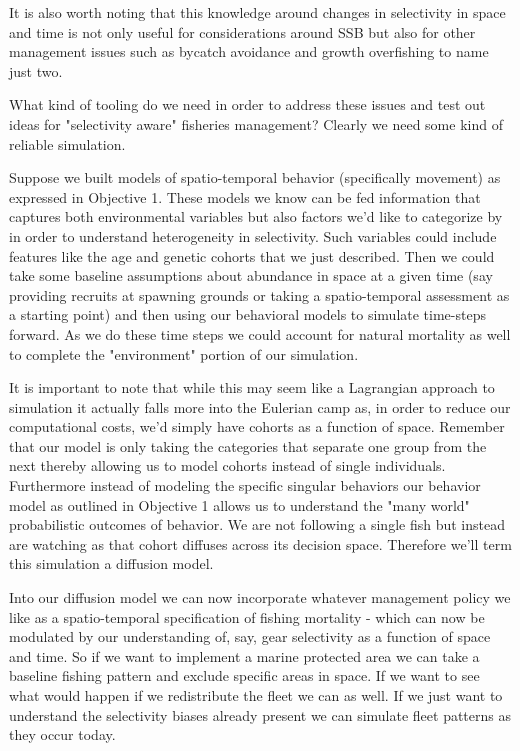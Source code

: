 \documentclass[11pt]{article}
\begin{document}
It is also worth noting that this knowledge around changes in selectivity in space and time is not only useful for considerations around SSB but also for other management issues such as bycatch avoidance and growth overfishing to name just two. 

What kind of tooling do we need in order to address these issues and test out ideas for "selectivity aware" fisheries management? Clearly we need some kind of reliable simulation. \newline

Suppose we built models of spatio-temporal behavior (specifically movement) as expressed in Objective 1. These models we know can be fed information that captures both environmental variables but also factors we'd like to categorize by in order to understand heterogeneity in selectivity. Such variables could include features like the age and genetic cohorts that we just described. Then we could take some baseline assumptions about abundance in space at a given time (say providing recruits at spawning grounds or taking a spatio-temporal assessment as a starting point) and then using our behavioral models to simulate time-steps forward. As we do these time steps we could account for natural mortality as well to complete the "environment" portion of our simulation. 

It is important to note that while this may seem like a Lagrangian approach to simulation it actually falls more into the Eulerian camp as, in order to reduce our computational costs, we'd simply have cohorts as a function of space. Remember that our model is only taking the categories that separate one group from the next thereby allowing us to model cohorts instead of single individuals. Furthermore instead of modeling the specific singular behaviors our behavior model as outlined in Objective 1 allows us to understand the "many world" probabilistic outcomes of behavior. We are not following a single fish but instead are watching as that cohort diffuses across its decision space. Therefore we'll term this simulation a diffusion model.

Into our diffusion model we can now incorporate whatever management policy we like as a spatio-temporal specification of fishing mortality - which can now be modulated by our understanding of, say, gear selectivity as a function of space and time. So if we want to implement a marine protected area we can take a baseline fishing pattern and exclude specific areas in space. If we want to see what would happen if we redistribute the fleet we can as well. If we just want to understand the selectivity biases already present we can simulate fleet patterns as they occur today. 
\end{document}
